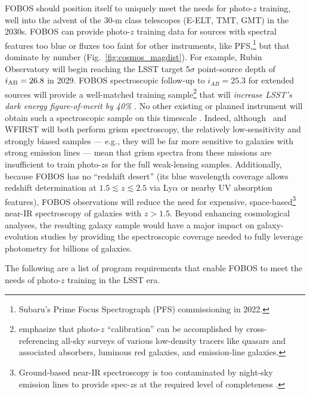 \documentclass[11pt,a4paper,twoside,onecolumn,openany,final,oldfontcommands]{memoir}
\def\YST#1{\noindent{\textcolor{lblue}{\textbf[YST: #1]}}}
\begin{document}
FOBOS should position itself to uniquely meet the needs for photo-$z$ training, well into the advent of the 30-m class telescopes (E-ELT, TMT, GMT) in the 2030s.  FOBOS can provide photo-$z$ training data for sources with spectral features too blue or fluxes too faint for other instruments, like PFS,\footnote{Subaru's Prime Focus Spectrograph (PFS) commissioning in 2022.} but that dominate by number (Fig.~\ref{fig:cosmos_magdist}).  For example, Rubin Observatory will begin reaching the LSST target 5$\sigma$ point-source depth of $i_{\rm AB} = 26.8$ in 2029.   FOBOS spectroscopic follow-up to $i_{AB} = 25.3$ for extended sources will provide a well-matched training sample\footnote{\citet{newman15} emphasize that photo-$z$ ``calibration'' can be accomplished by cross-referencing all-sky surveys of various low-density tracers like quasars and associated absorbers, luminous red galaxies, and emission-line galaxies.} that will \textit{increase LSST's dark energy figure-of-merit by 40\%}  \citep{newman15}. No other existing or planned instrument will obtain such a spectroscopic sample on this timescale \YST{how about MSE? Just a bit concerned about including the word "planned"}.  Indeed, although \euclid\ and WFIRST will both perform grism spectroscopy, the relatively low-sensitivity and strongly biased samples --- e.g., they will be far more sensitive to galaxies with strong emission lines --- mean that grism spectra from these missions are insufficient to train photo-$z$s for the full weak-lensing samples.  Additionally, because FOBOS has no ``redshift desert'' (its blue wavelength coverage allows redshift determination at $1.5\lesssim z \lesssim2.5$ via Ly$\alpha$ or nearby UV absorption features), FOBOS observations will reduce the need for expensive, space-based\footnote{Ground-based near-IR spectroscopy is too contaminated by night-sky emission lines to provide spec-$z$s at the required level of completeness \citep{newman15}.} near-IR spectroscopy of galaxies with $z > 1.5$.  Beyond enhancing cosmological analyses, the resulting galaxy sample would have a major impact on galaxy-evolution studies by providing the spectroscopic coverage needed to fully leverage photometry for billions of galaxies. %


The following are a list of program requirements that enable FOBOS to meet the needs of photo-$z$ training in the LSST era.  
\end{document}
